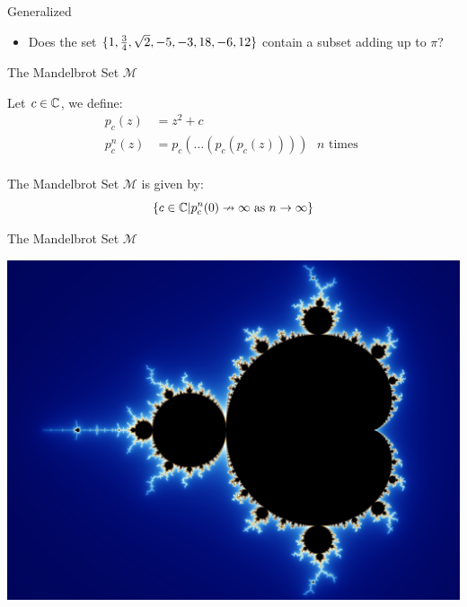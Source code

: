\documentclass[c]{beamer}
\begin{document}
\begin{frame}{\subsum{} Generalized}
  
  \begin{itemize}
  \item[] Does the set $\{1,\frac{3}{4},\sqrt{2},-5,-3,18,-6,12\}$
    contain a subset adding up to $\pi$?
  \end{itemize}
\end{frame}

\begin{frame}{The Mandelbrot Set $\mathcal{M}$}
  
  Let $c \in \mathbb{C}$, we define:
    \begin{align*}
      p_c(z) &= z^2 + c\\
      p_c^n(z) &= p_c(\ldots(p_c(p_c(z)))) \text{ $n$ times }\\
    \end{align*}
    
    \vspace{-\baselineskip}
    
    The Mandelbrot Set $\mathcal{M}$ is given by:
    $$\{c \in \mathbb{C} |p_c^n(0) \nrightarrow \infty \text{ as } n \rightarrow \infty\}$$
    
\end{frame}

\begin{frame}{The Mandelbrot Set $\mathcal{M}$}

  \includegraphics[width=\textwidth]{media/mandelbrot.jpg}
  
\end{frame}
\end{document}
